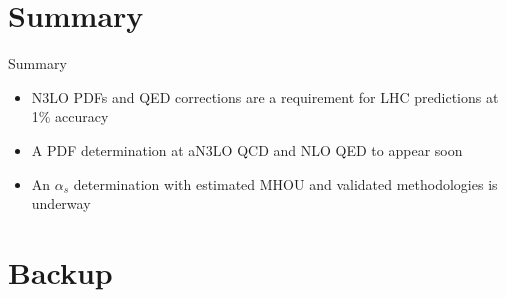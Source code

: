 \documentclass[8pt,t]{beamer}
\begin{document}
\section{Summary}

\begin{frame}[c]{Summary}
  \begin{itemize}
    \item N3LO PDFs and QED corrections are a requirement for LHC predictions at 1\% accuracy
    \item A PDF determination at aN3LO QCD and NLO QED to appear soon
    \item An $\alpha_s$ determination with estimated MHOU and validated methodologies is underway
  \end{itemize}

  \vspace*{2em}
\end{frame}



\appendix
\section{Backup}


\end{document}
